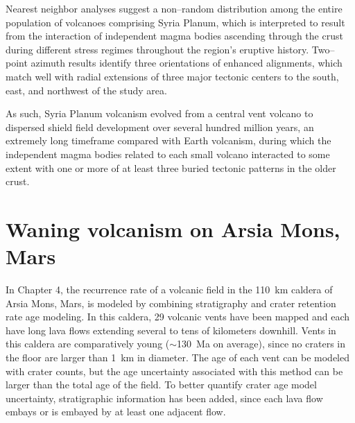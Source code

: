 Nearest neighbor analyses suggest a non--random distribution among the entire population of volcanoes comprising Syria Planum, which is interpreted to result from the interaction of independent magma bodies ascending through the crust during different stress regimes throughout the region's eruptive history. Two--point azimuth results identify three orientations of enhanced alignments, which match well with radial extensions of three major tectonic centers to the south, east, and northwest of the study area. 

As such, Syria Planum volcanism evolved from a central vent volcano to dispersed shield field development over several hundred million years, an extremely long timeframe compared with Earth volcanism, during which the independent magma bodies related to each small volcano interacted to some extent with one or more of at least three buried tectonic patterns in the older crust.


\section{Waning volcanism on Arsia Mons, Mars}
In Chapter 4, the recurrence rate of a volcanic field in the 110~km caldera of Arsia Mons, Mars, is modeled by combining stratigraphy and crater retention rate age modeling. In this caldera, 29 volcanic vents have been mapped and each have long lava flows extending several to tens of kilometers downhill. Vents in this caldera are comparatively young ($\sim$130~Ma on average), since no craters in the floor are larger than 1~km in diameter. The age of each vent can be modeled with crater counts, but the age uncertainty associated with this method can be larger than the total age of the field. To better quantify crater age model uncertainty, stratigraphic information has been added, since each lava flow embays or is embayed by at least one adjacent flow.

